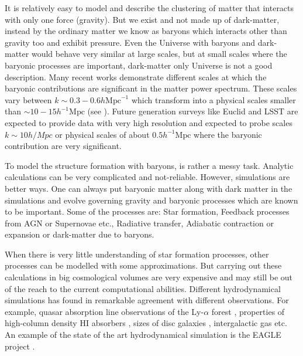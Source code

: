 It is relatively easy to model and describe the clustering of matter that interacts with only 
one force (gravity). But we exist and not made up of dark-matter, instead by the
ordinary matter we know as baryons which interacts other than gravity too and exhibit pressure. 
Even the Universe with baryons and dark-matter would behave very similar at large scales,
but at small scales where the baryonic processes are important, dark-matter only Universe is
not a good description. Many recent works demonstrate different scales at which the baryonic
contributions are significant in the matter power spectrum. These scales vary between
$k\sim 0.3-0.6 h \mathrm{Mpc}^{-1}$ which transform into a physical scales smaller than
$\sim 10-15 h^{-1} \mathrm{Mpc}$ (see \cite{2011MNRAS.415.3649V,2014MNRAS.440.2997V}). 
Future generation surveys like Euclid \cite{2010arXiv1001.0061R,2013LRR....16....6A} and LSST 
\cite{2009arXiv0912.0201L} are
expected to provide data with very high resolution and expected to probe scales $k \sim 10 h/Mpc$
or physical scales of about $0.5 h^{-1} \mathrm{Mpc}$ where the baryonic contribution 
are very significant.

To model the structure formation with baryons, is rather a messy task. Analytic calculations
can be very complicated and not-reliable. However, simulations are better ways. One can always
put baryonic matter along with dark matter in the simulations and evolve governing gravity and
baryonic processes which are known to be important. Some of the processes are: 
Star formation,
Feedback processes from AGN or Supernovae etc.,
Radiative transfer,
Adiabatic contraction or expansion or dark-matter due to baryons.

When there is very little understanding of star formation processes, other processes can be 
modelled with some approximations. But carrying out these calculations in big cosmological 
volumes are very expensive and may still be out of the reach to the current computational 
abilities. 
Different hydrodynamical simulations has found in remarkable agreement
with different observations. For example, quasar absorption line observations
of the Ly-$\alpha$ forest \cite{1994ApJ...437L...9C,1998MNRAS.297L..49T,1998ApJ...495...44C}, 
properties of high-column density HI absorbers \cite{2008MNRAS.390.1349P,2011ApJ...743...82M,2013MNRAS.430.2427R}, sizes of disc galaxies \cite{2004ApJ...607..688G,2011MNRAS.410.1391A,2011ApJ...742...76G,2013MNRAS.436.3031V,2014MNRAS.437.1750M}, intergalactic
gas \cite{2012MNRAS.420..829O,2012MNRAS.425.1270S} etc. An example of the state of the art 
hydrodynamical simulation is the
EAGLE project \cite{2015MNRAS.446..521S}. 


